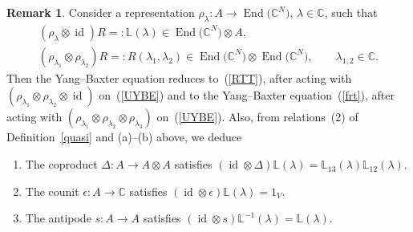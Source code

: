 \documentclass[10pt,a4paper]{amsart}
\numberwithin{equation}{section}
\theoremstyle{definition}
\newtheorem{rem}[thm]{Remark}
\newcommand{\id}{\operatorname{id}}
\DeclareMathOperator{\EEnd}{End}%
\def\mathcal#1{#1}%
\begin{document}
\begin{rem} \label{remy} Consider a representation $\rho_{\lambda}\colon \mathcal{A} \to \EEnd\bigl({\mathbb C}^{\mathcal N}\bigr)$, $\lambda \in {\mathbb C}$, such that
\begin{gather*}
(\rho_{\lambda} \otimes \id){\mathcal R} =: {\mathbb L}(\lambda) \in \EEnd\bigl({\mathbb C}^{\mathcal N}\bigr) \otimes \mathcal{A},\\
(\rho_{\lambda_1} \otimes \rho_{\lambda_2}){\mathcal R} =: R(\lambda_1, \lambda_2)\in \EEnd\bigl({\mathbb C}^{\mathcal N}\bigr) \otimes \EEnd\bigl({\mathbb C}^{\mathcal N}\bigr), \qquad \lambda_{1,2} \in {\mathbb C}.
\end{gather*}
 Then the Yang--Baxter equation reduces to~(\ref{RTT}), after acting with $(\rho_{\lambda_1} \otimes \rho_{\lambda_2} \otimes \id)$ on~(\ref{UYBE}) and to the Yang--Baxter equation~(\ref{frt}), after acting with $(\rho_{\lambda_1} \otimes \rho_{\lambda_2} \otimes \rho_{\lambda_3})$ on~(\ref{UYBE}).
Also, from relations~(2) of Definition~\ref{quasi} and (a)--(b) above, we deduce
\begin{enumerate}\itemsep=0pt
 \item[{(i)}] The coproduct $\Delta\colon \mathcal{A} \to \mathcal{A} \otimes \mathcal{A}$ satisfies $(\id \otimes \Delta){\mathbb L}(\lambda) ={\mathbb L}_{13}(\lambda) {\mathbb L}_{12}(\lambda)$.
\item[{(ii)}] The counit $\epsilon\colon \mathcal{A} \to {\mathbb C}$ satisfies $(\id \otimes \epsilon) {\mathbb L}(\lambda) = 1_{V}$.
\item[{(iii)}] The antipode $s\colon \mathcal{A} \to \mathcal{A}$ satisfies $(\id \otimes s){\mathbb L}^{-1}(\lambda) ={\mathbb L}(\lambda)$.
\end{enumerate}
\end{rem}
\end{document}
